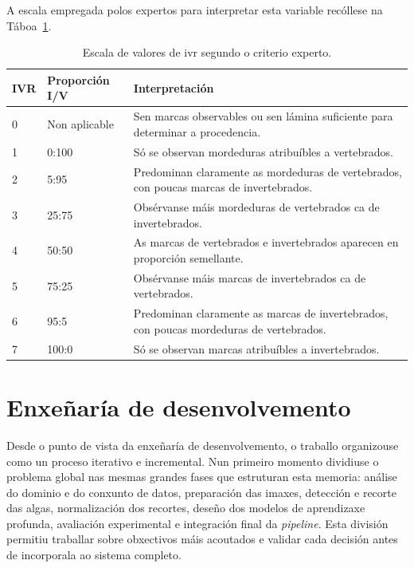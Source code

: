 A escala empregada polos expertos para interpretar esta variable recóllese na
Táboa~\ref{tab:escala-ivr}.

\clearpage
{
\begin{table}[H]
  \centering
  \begin{tabular}{p{}|p{}|p{}}
  \rowcolor{udcpink!25}
  \textbf{IVR} & \textbf{Proporción I/V} & \textbf{Interpretación} \\\hline
  0 & Non aplicable & Sen marcas observables ou sen lámina suficiente para determinar a procedencia. \\
  1 & 0:100 & Só se observan mordeduras atribuíbles a vertebrados. \\
  2 & 5:95 & Predominan claramente as mordeduras de vertebrados, con poucas marcas de invertebrados. \\
  3 & 25:75 & Obsérvanse máis mordeduras de vertebrados ca de invertebrados. \\
  4 & 50:50 & As marcas de vertebrados e invertebrados aparecen en proporción semellante. \\
  5 & 75:25 & Obsérvanse máis marcas de invertebrados ca de vertebrados. \\
  6 & 95:5 & Predominan claramente as marcas de invertebrados, con poucas mordeduras de vertebrados. \\
  7 & 100:0 & Só se observan marcas atribuíbles a invertebrados. \\
  \end{tabular}
  \caption{Escala de valores de \gls{ivr} segundo o criterio experto.}
  \label{tab:escala-ivr}
\end{table}
}
\clearpage

\section{Enxeñaría de desenvolvemento}
Desde o punto de vista da enxeñaría de desenvolvemento, o traballo organizouse como un proceso
iterativo e incremental. Nun primeiro momento dividiuse o problema global nas mesmas grandes fases
que estruturan esta memoria: análise do dominio e do conxunto de datos, preparación das imaxes,
detección e recorte das algas, normalización dos recortes, deseño dos modelos de aprendizaxe
profunda, avaliación experimental e integración final da \textit{pipeline}. Esta división permitiu
traballar sobre obxectivos máis acoutados e validar cada decisión antes de incorporala ao sistema
completo.

